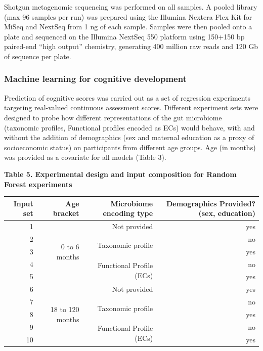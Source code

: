 \documentclass{article}
\begin{document}
Shotgun metagenomic sequencing was performed on all samples. A pooled
library (max 96 samples per run) was prepared using the Illumina Nextera
Flex Kit for MiSeq and NextSeq from 1 ng of each sample. Samples were
then pooled onto a plate and sequenced on the Illumina NextSeq 550
platform using 150+150 bp paired-end ``high output'' chemistry,
generating 400 million raw reads and 120 Gb of sequence per plate.

\subsubsection*{Machine learning for cognitive development}

Prediction of cognitive scores was carried out as a set of regression
experiments targeting real-valued continuous assessment scores.
Different experiment sets were designed to probe how different
representations of the gut microbiome (taxonomic profiles, Functional
profiles encoded as ECs) would behave, with and without the addition of
demographics (sex and maternal education as a proxy of socioeconomic
status) on participants from different age groups. Age (in months) was
provided as a covariate for all models (Table 3).

\textbf{Table 5. Experimental design and input composition for Random
Forest experiments}

\begin{table}
    \begin{tabular}{rrrr}
      \hline\hline
      \textbf{Input set} & \textbf{Age bracket} & \textbf{Microbiome encoding type} & \textbf{Demographics Provided? (sex, education)} \\\hline
      1 & \multirow{5}{*}{0 to 6 months} & Not provided & yes \\
      2 &  & \multirow{2}{*}{Taxonomic profile} & no \\
      3 &  &  & yes \\
      4 &  & \multirow{2}{*}{Functional Profile (ECs)} & no \\
      5 &  &  & yes \\
      6 & \multirow{5}{*}{18 to 120 months} & Not provided & yes \\
      7 &  & \multirow{2}{*}{Taxonomic profile} & no \\
      8 &  &  & yes \\
      9 &  & \multirow{2}{*}{Functional Profile (ECs)} & no \\
      10 &  &  & yes \\\hline\hline
    \end{tabular}
\end{table}
\end{document}
